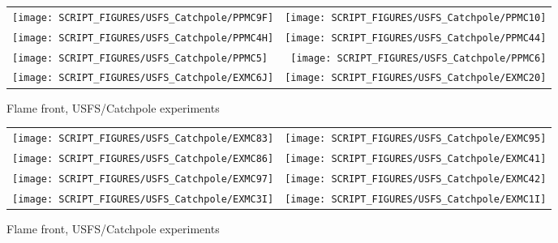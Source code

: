 \begin{figure}[p]
\begin{tabular*}{\textwidth}{l@{\extracolsep{\fill}}r}
\texttt{[image: SCRIPT\_FIGURES/USFS\_Catchpole/PPMC9F]} &
\texttt{[image: SCRIPT\_FIGURES/USFS\_Catchpole/PPMC10]} \\
\texttt{[image: SCRIPT\_FIGURES/USFS\_Catchpole/PPMC4H]} &
\texttt{[image: SCRIPT\_FIGURES/USFS\_Catchpole/PPMC44]} \\
\texttt{[image: SCRIPT\_FIGURES/USFS\_Catchpole/PPMC5]} &
\texttt{[image: SCRIPT\_FIGURES/USFS\_Catchpole/PPMC6]} \\
\texttt{[image: SCRIPT\_FIGURES/USFS\_Catchpole/EXMC6J]} &
\texttt{[image: SCRIPT\_FIGURES/USFS\_Catchpole/EXMC20]} \\
\end{tabular*}
\caption[Flame front, USFS/Catchpole experiments]{Flame front, USFS/Catchpole experiments}
\label{USFS_Catchpole_248}
\end{figure}

\begin{figure}[p]
\begin{tabular*}{\textwidth}{l@{\extracolsep{\fill}}r}
\texttt{[image: SCRIPT\_FIGURES/USFS\_Catchpole/EXMC83]} &
\texttt{[image: SCRIPT\_FIGURES/USFS\_Catchpole/EXMC95]} \\
\texttt{[image: SCRIPT\_FIGURES/USFS\_Catchpole/EXMC86]} &
\texttt{[image: SCRIPT\_FIGURES/USFS\_Catchpole/EXMC41]} \\
\texttt{[image: SCRIPT\_FIGURES/USFS\_Catchpole/EXMC97]} &
\texttt{[image: SCRIPT\_FIGURES/USFS\_Catchpole/EXMC42]} \\
\texttt{[image: SCRIPT\_FIGURES/USFS\_Catchpole/EXMC3I]} &
\texttt{[image: SCRIPT\_FIGURES/USFS\_Catchpole/EXMC1I]} \\
\end{tabular*}
\caption[Flame front, USFS/Catchpole experiments]{Flame front, USFS/Catchpole experiments}
\label{USFS_Catchpole_256}
\end{figure}

